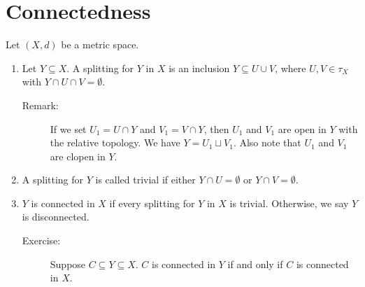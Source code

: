 \documentclass[9pt]{extarticle}
\begin{document}
  \section{Connectedness}%
  Let $(X,d)$ be a metric space. 
  \begin{enumerate}[(1)]
    \item Let $Y\subseteq X$. A splitting for $Y$ in $X$ is an inclusion $Y\subseteq U\cup V$, where $U,V\in \tau_X$ with $Y\cap U \cap V = \emptyset$.
      \begin{description}
        \item[Remark:] If we set $U_1 = U\cap Y$ and $V_1 = V\cap Y$, then $U_1$ and $V_1$ are open in $Y$ with the relative topology. We have $Y = U_1\sqcup V_1$. Also note that $U_1$ and $V_1$ are clopen in $Y$.
      \end{description}
    \item A splitting for $Y$ is called trivial if either $Y\cap U = \emptyset$ or $Y\cap V = \emptyset$.
    \item $Y$ is connected in $X$ if every splitting for $Y$ in $X$ is trivial. Otherwise, we say $Y$ is disconnected.
    \begin{description}
      \item[Exercise:] Suppose $C\subseteq Y\subseteq X$. $C$ is connected in $Y$ if and only if $C$ is connected in $X$.
    \end{description}
  \end{enumerate}
\end{document}

